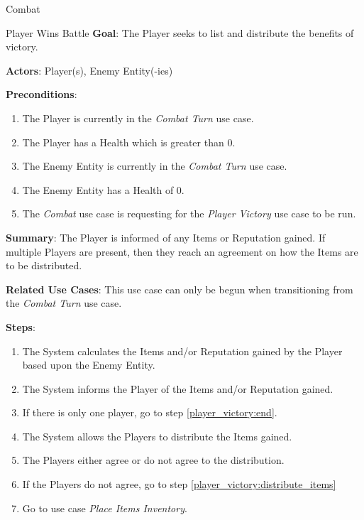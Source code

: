 \documentclass[12pt]{report}
\begin{document}
\begin{section}{Combat}
    \begin{subsection}{Player Wins Battle}
      \textbf{Goal}:
      The Player seeks to list and distribute the benefits of victory.
      
      \textbf{Actors}:
      Player(s), Enemy Entity(-ies)

      \textbf{Preconditions}:
      \begin{enumerate}
        \item The Player is currently in the \textit{Combat Turn} use case.
        \item The Player has a Health which is greater than 0.
        \item The Enemy Entity is currently in the \textit{Combat Turn} use case.
        \item The Enemy Entity has a Health of 0.
        \item The \textit{Combat} use case is requesting for the \textit{Player Victory} use case to be run.
      \end{enumerate}

      \textbf{Summary}:
      The Player is informed of any Items or Reputation gained. If multiple
      Players are present, then they reach an agreement on how the Items are to
      be distributed.

      \textbf{Related Use Cases}:
      This use case can only be begun when transitioning from the \textit{Combat Turn}
      use case.

      \textbf{Steps}:
      \begin{enumerate}
        \item The System calculates the Items and/or Reputation gained by the
	       Player based upon the Enemy Entity.
        \item The System informs the Player of the Items and/or Reputation gained.
        \item If there is only one player, go to step \ref{player_victory:end}.
        \item \label{player_victory:distribute_items} The System allows the Players
        to distribute the Items gained.
        \item The Players either agree or do not agree to the distribution.
        \item If the Players do not agree,
	      go to step \ref{player_victory:distribute_items}
        \item \label{player_victory:end} Go to use case \textit{Place Items Inventory}.
      \end{enumerate}
    \end{subsection}
  \end{section}
\end{document}
